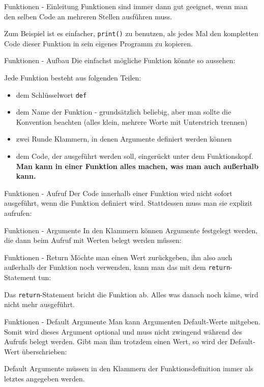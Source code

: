 \begin{frame}{Funktionen - Einleitung}
	Funktionen sind immer dann gut geeignet, wenn man den selben Code an mehreren Stellen ausführen muss.
		
	Zum Beispiel ist es einfacher, \alert{\texttt{print()}} zu benutzen, als jedes Mal den kompletten Code dieser Funktion in sein eigenes Programm zu kopieren.
\end{frame}

\begin{frame}{Funktionen - Aufbau}
	Die einfachst mögliche Funktion könnte so aussehen:
	
	\pause
	Jede Funktion besteht aus folgenden Teilen:
	\pause
	\begin{itemize}
		\item dem Schlüsselwort \alert{\texttt{def}}
		\pause
		\item dem Name der Funktion - grundsätzlich beliebig, aber man sollte  die Konvention beachten (alles klein, mehrere Worte mit Unterstrich trennen)
		\pause
		\item zwei Runde Klammern, in denen Argumente definiert werden können
		\pause
		\item dem Code, der ausgeführt werden soll, eingerückt unter dem Funktionskopf. \textbf{Man kann in einer Funktion alles machen, was man auch außerhalb kann.}
	\end{itemize}
\end{frame}

\begin{frame}{Funktionen - Aufruf}
	Der Code innerhalb einer Funktion wird nicht sofort ausgeführt, wenn die Funktion definiert wird. Stattdessen muss man sie explizit aufrufen:
	
\end{frame}

\begin{frame}{Funktionen - Argumente}
	In den Klammern können Argumente festgelegt werden, die dann beim Aufruf mit Werten belegt werden müssen:
	
\end{frame}

\begin{frame}{Funktionen - Return}
	Möchte man einen Wert zurückgeben, ihn also auch außerhalb der Funktion noch verwenden, kann man das mit dem \alert{\texttt{return}}-Statement tun:
	
	Das \alert{\texttt{return}}-Statement bricht die Funktion ab. Alles was danach noch käme, wird nicht mehr ausgeführt.
\end{frame}

\begin{frame}{Funktionen - Default Argumente}
	Man kann Argumenten Default-Werte mitgeben. Somit wird dieses Argument optional und muss nicht zwingend während des Aufrufs belegt werden. Gibt man ihm trotzdem einen Wert, so wird der Default-Wert überschrieben:
	
	Default Argumente müssen in den Klammern der Funktionsdefinition immer als letztes angegeben werden.
\end{frame}


